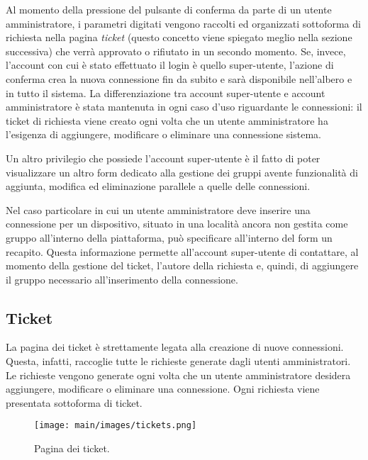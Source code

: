 Al momento della pressione del pulsante di conferma da parte di un utente amministratore, i parametri digitati vengono raccolti ed organizzati sottoforma di richiesta nella pagina \textit{ticket} (questo concetto viene spiegato meglio nella sezione successiva) che verrà approvato o rifiutato in un secondo momento. Se, invece, l'account con cui è stato effettuato il login è quello super-utente, l'azione di conferma crea la nuova connessione fin da subito e sarà disponibile nell'albero e in tutto il sistema.
La differenziazione tra account super-utente e account amministratore è stata mantenuta in ogni caso d'uso riguardante le connessioni: il ticket di richiesta viene creato ogni volta che un utente amministratore ha l'esigenza di aggiungere, modificare o eliminare una connessione sistema. 

Un altro privilegio che possiede l'account super-utente è il fatto di poter visualizzare un altro form dedicato alla gestione dei gruppi avente funzionalità di aggiunta, modifica ed eliminazione parallele a quelle delle connessioni.

Nel caso particolare in cui un utente amministratore deve inserire una connessione per un dispositivo, situato in una località ancora non gestita come gruppo all'interno della piattaforma, può specificare all'interno del form un recapito. Questa informazione permette all'account super-utente di contattare, al momento della gestione del ticket, l'autore della richiesta e, quindi, di aggiungere il gruppo necessario all'inserimento della connessione.

\subsection{Ticket}
\label{sec:ticket}
La pagina dei ticket è strettamente legata alla creazione di nuove connessioni. Questa, infatti, raccoglie tutte le richieste generate dagli utenti amministratori. 
Le richieste vengono generate ogni volta che un utente amministratore desidera aggiungere, modificare o eliminare una connessione. Ogni richiesta viene presentata sottoforma di ticket.

\begin{figure}
\begin{center}
\texttt{[image: main/images/tickets.png]}
\end{center}
\caption{Pagina dei ticket.}
\label{fig:tickets}
\end{figure}

